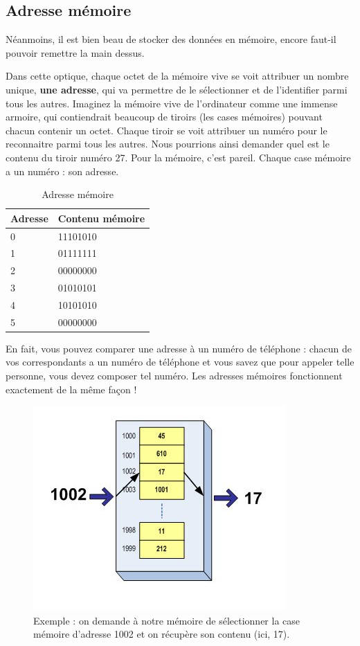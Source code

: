 \subsection{Adresse mémoire}\label{adresse-muxe9moire}

Néanmoins, il est bien beau de stocker des données en mémoire, encore
faut-il pouvoir remettre la main dessus.

Dans cette optique, chaque octet de la mémoire vive se voit attribuer
un nombre unique, \textbf{une adresse}, qui va permettre de le
sélectionner et de l'identifier parmi tous les autres. Imaginez la
mémoire vive de l'ordinateur comme une immense armoire, qui
contiendrait beaucoup de tiroirs (les cases mémoires) pouvant chacun
contenir un octet. Chaque tiroir se voit attribuer un numéro pour le
reconnaitre parmi tous les autres. Nous pourrions ainsi demander quel
est le contenu du tiroir numéro 27. Pour la mémoire, c'est
pareil. Chaque case mémoire a un numéro : son adresse.

\begin{table}[ht!]
\centering
{}
\begin{tabular}{|l|l|}
\hline
\rowcolor{gris-tab-entete}\textbf{Adresse} & \textbf{Contenu mémoire}\tabularnewline\hline
0 & 11101010\tabularnewline\hline
1 & 01111111\tabularnewline\hline
2 & 00000000\tabularnewline\hline
3 & 01010101\tabularnewline\hline
4 & 10101010\tabularnewline\hline
5 & 00000000\tabularnewline\hline
\end{tabular}
\caption{Adresse mémoire}
\end{table}

En fait, vous pouvez comparer une adresse à un numéro de téléphone :
chacun de vos correspondants a un numéro de téléphone et vous savez
que pour appeler telle personne, vous devez composer tel numéro. Les
adresses mémoires fonctionnent exactement de la même façon !

\begin{figure}[ht!]
\centering
\includegraphics[scale=0.6]{images/adresse_memoire.jpg}
\caption{Exemple : on demande à notre mémoire de sélectionner la case
mémoire d'adresse 1002 et on récupère son contenu (ici, 17).}
\end{figure}

